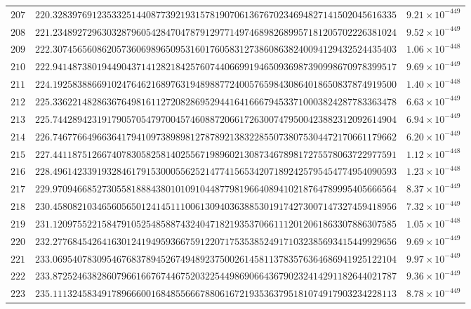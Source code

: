 \documentclass[12pt,reqno]{amsart}
\theoremstyle{remark}
\begin{document}
\begin{longtable}{clc}
$207$ & $220.3283976912353325144087739219315781907061367670234694827141502045616335$ & $9.21\times 10^{-449}$ \\
$208$ & $221.2348927296303287960542847047879129771497468982689957181205702226381024$ & $9.52\times 10^{-449}$ \\
$209$ & $222.3074565608620573606989650953160176058312738608638240094129432524435403$ & $1.06\times 10^{-448}$ \\
$210$ & $222.9414873801944904371412821842576074406699194650936987390998670978399517$ & $9.69\times 10^{-449}$ \\
$211$ & $224.1925838866910247646216897631948988772400576598430864018650837874919500$ & $1.40\times 10^{-448}$ \\
$212$ & $225.3362214828636764981611272082869529441641666794533710003824287783363478$ & $6.63\times 10^{-449}$ \\
$213$ & $225.7442894231917905705479700457460887206617263007479500423882312092614904$ & $6.94\times 10^{-449}$ \\
$214$ & $226.7467766496636417941097389898127878921383228550738075304472170661179662$ & $6.20\times 10^{-449}$ \\
$215$ & $227.4411875126674078305825814025567198960213087346789817275578063722977591$ & $1.12\times 10^{-448}$ \\
$216$ & $228.4961423391932846179153000556252147741565342071892425795454774954090593$ & $1.23\times 10^{-448}$ \\
$217$ & $229.9709466852730558188843801010910448779819664089410218764789995405666564$ & $8.37\times 10^{-449}$ \\
$218$ & $230.4580821034656056501241451110061309403638853019174273007147327459418956$ & $7.32\times 10^{-449}$ \\
$219$ & $231.1209755221584791052548588743240471821935370661112012061863307886307585$ & $1.05\times 10^{-448}$ \\
$220$ & $232.2776845426416301241949593667591220717535385249171032385693415449929656$ & $9.69\times 10^{-449}$ \\
$221$ & $233.0695407830954676837894526749489237500261458113783576364686941925122104$ & $9.97\times 10^{-449}$ \\
$222$ & $233.8725246382860796616676744675203225449869066436790232414291182644021787$ & $9.36\times 10^{-449}$ \\
$223$ & $235.1113245834917896660016848556667880616721935363795181074917903234228113$ & $8.78\times 10^{-449}$ \\

\end{longtable}
\end{document}

